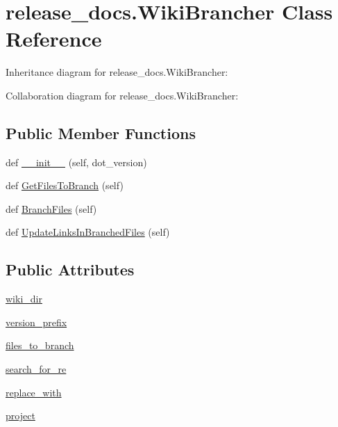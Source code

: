 \hypertarget{classrelease__docs_1_1_wiki_brancher}{}\section{release\+\_\+docs.\+Wiki\+Brancher Class Reference}
\label{classrelease__docs_1_1_wiki_brancher}


Inheritance diagram for release\+\_\+docs.\+Wiki\+Brancher\+:


Collaboration diagram for release\+\_\+docs.\+Wiki\+Brancher\+:
\subsection*{Public Member Functions}
\begin{DoxyCompactItemize}
\item 
def \hyperlink{classrelease__docs_1_1_wiki_brancher_a344b32e2b65f0e8bab9fbf1e670d33fd}{\+\_\+\+\_\+init\+\_\+\+\_\+} (self, dot\+\_\+version)
\item 
def \hyperlink{classrelease__docs_1_1_wiki_brancher_a05fc4282f501fb0210ecb33fd1d209a6}{Get\+Files\+To\+Branch} (self)
\item 
def \hyperlink{classrelease__docs_1_1_wiki_brancher_a5ef284f7e1742f465ecd0c14d2667327}{Branch\+Files} (self)
\item 
def \hyperlink{classrelease__docs_1_1_wiki_brancher_aa0bc4b1b78426fe7a8496d570b540f1d}{Update\+Links\+In\+Branched\+Files} (self)
\end{DoxyCompactItemize}
\subsection*{Public Attributes}
\begin{DoxyCompactItemize}
\item 
\hyperlink{classrelease__docs_1_1_wiki_brancher_ad86478c9538ac0bf3916f67eb5da2910}{wiki\+\_\+dir}
\item 
\hyperlink{classrelease__docs_1_1_wiki_brancher_aae330aeef850b105795c5d75727448ba}{version\+\_\+prefix}
\item 
\hyperlink{classrelease__docs_1_1_wiki_brancher_a938c78ba6e8adfb6af039dd500ac6466}{files\+\_\+to\+\_\+branch}
\item 
\hyperlink{classrelease__docs_1_1_wiki_brancher_a029ce9007fefd6ac5f13bacdedb29af5}{search\+\_\+for\+\_\+re}
\item 
\hyperlink{classrelease__docs_1_1_wiki_brancher_aa33d991e629cc94fbfefe4f8569e283e}{replace\+\_\+with}
\item 
\hyperlink{classrelease__docs_1_1_wiki_brancher_a4ac9c796f95690cca04049b557055443}{project}
\end{DoxyCompactItemize}


